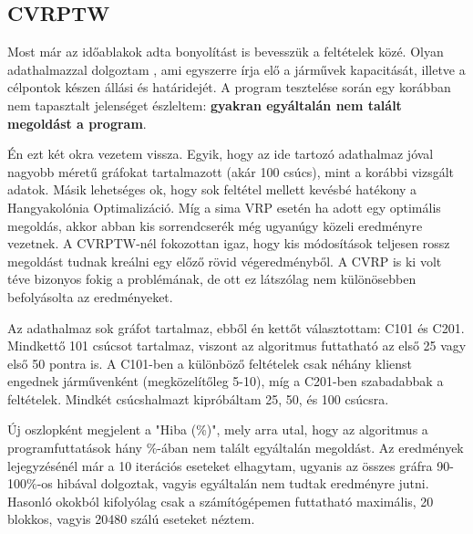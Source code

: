 \newpage
\newpage
\newpage
\newpage

\subsection{CVRPTW} \label{CVRPTWsection}
Most már az időablakok adta bonyolítást is bevesszük a feltételek közé. Olyan adathalmazzal dolgoztam \cite{VRPTWdataset}, ami egyszerre írja elő a járművek kapacitását, illetve a célpontok készen állási és határidejét. A program tesztelése során egy korábban nem tapasztalt jelenséget észleltem: \textbf{gyakran egyáltalán nem talált megoldást a program}.

Én ezt két okra vezetem vissza. Egyik, hogy az ide tartozó adathalmaz jóval nagyobb méretű gráfokat tartalmazott (akár 100 csúcs), mint a korábbi vizsgált adatok. Másik lehetséges ok, hogy sok feltétel mellett kevésbé hatékony a Hangyakolónia Optimalizáció. Míg a sima VRP esetén ha adott egy optimális megoldás, akkor abban kis sorrendcserék még ugyanúgy közeli eredményre vezetnek. A CVRPTW-nél fokozottan igaz, hogy kis módosítások teljesen rossz megoldást tudnak kreálni egy előző rövid végeredményből. A CVRP is ki volt téve bizonyos fokig a problémának, de ott ez látszólag nem különösebben befolyásolta az eredményeket.

Az adathalmaz sok gráfot tartalmaz, ebből én kettőt választottam: C101 és C201. Mindkettő 101 csúcsot tartalmaz, viszont az algoritmus futtatható az első 25 vagy első 50 pontra is. A C101-ben a különböző feltételek csak néhány klienst engednek járművenként (megközelítőleg 5-10), míg a C201-ben szabadabbak a feltételek. Mindkét csúcshalmazt kipróbáltam 25, 50, és 100 csúcsra.

Új oszlopként megjelent a "Hiba (\%)", mely arra utal, hogy az algoritmus a programfuttatások hány \%-ában nem talált egyáltalán megoldást. Az eredmények lejegyzésénél már a 10 iterációs eseteket elhagytam, ugyanis az összes gráfra 90-100\%-os hibával dolgoztak, vagyis egyáltalán nem tudtak eredményre jutni. Hasonló okokból kifolyólag csak a számítógépemen futtatható maximális, 20 blokkos, vagyis 20480 szálú eseteket néztem.


